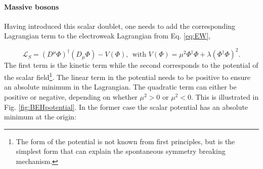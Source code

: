 \paragraph{Massive bosons}
Having introduced this scalar doublet, one needs to add the corresponding Lagrangian term to the electroweak Lagrangian from Eq. \ref{eq:EW}, 

\begin{equation}
\label{eq:higgslagrangian}
\mathcal{L}_S = \left(D^\mu\Phi\right)^\dagger \left(D_\mu \Phi\right) - V\left(\Phi\right), \ \ \textrm{with } V\left(\Phi\right) = \mu^2 \Phi^\dagger\Phi + \lambda \left(\Phi^\dagger \Phi\right)^2. 
\end{equation}
\noindent The first term is the kinetic term while the second corresponds to the potential of the scalar field\footnote{The form of the potential is not known from first principles, but is the simplest form that can explain the spontaneous symmetry breaking mechanism.}. The linear term in the potential needs to be positive to ensure an absolute minimum in the Lagrangian. The quadratic term can either be positive or negative, depending on whether $\mu^2 > 0$ or $\mu^2 < 0$. This is illustrated in Fig. \ref{fig:BEHpotential}. In the former case the scalar potential has an absolute minimum at the origin:

